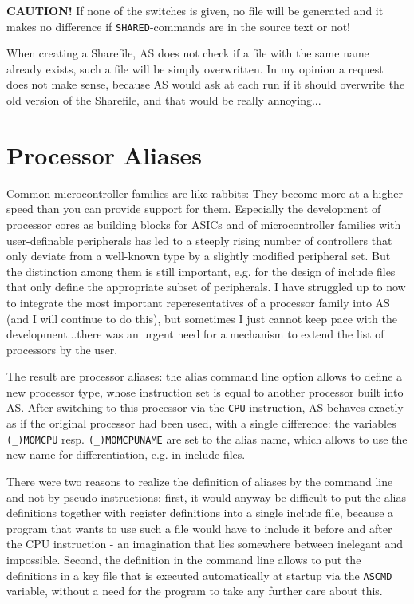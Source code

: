 \documentclass[12pt,twoside]{report}
\newcommand{\bb}[1]{{\bf #1}}
\newcommand{\tty}[1]{{\tt #1}}
\newcommand{\asname}{{AS}}
\newcommand{\predefsym}[1]{{\tt (\_)#1}}
\begin{document}
\bb{CAUTION!} If none of the switches is given, no file will be
generated and it makes no difference if \tty{SHARED}-commands are in the
source text or not!

When creating a Sharefile, \asname{} does not check if a file with the
same name already exists, such a file  will be simply overwritten.
In my opinion a request does not make sense, because \asname{} would
ask at each run if it should overwrite the old version of the
Sharefile, and that would be really annoying...


\section{Processor Aliases}
\label{SectAlias}

Common microcontroller families are like rabbits: They become more at
a higher speed than you can provide support for them.  Especially the
development of processor cores as building blocks for ASICs and of
microcontroller families with user-definable peripherals has led to a
steeply rising number of controllers that only deviate from a
well-known type by a slightly modified peripheral set.  But the
distinction among them is still important, e.g. for the design of
include files that only define the appropriate subset of peripherals.
I have struggled up to now to integrate the most important
reperesentatives of a processor family into \asname{} (and I will continue
to do this), but sometimes I just cannot keep pace with the
development...there was an urgent need for a mechanism to extend the
list of processors by the user.

The result are processor aliases: the alias command line option allows to
define a new processor type, whose instruction set is equal to another
processor built into \asname{}.  After switching to this processor via the
\tty{CPU} instruction, \asname{} behaves exactly as if the original processor had
been used, with a single difference: the variables \predefsym{MOMCPU} resp.
\predefsym{MOMCPUNAME} are set to the alias name, which allows to use the new
name for differentiation, e.g. in include files.

There were two reasons to realize the definition of aliases by the
command line and not by pseudo instructions: first, it would anyway be
difficult to put the alias definitions together with register definitions
into a single include file, because a program that wants to use such a
file would have to include it before and after the CPU instruction - an
imagination that lies somewhere between inelegant and impossible.  Second,
the definition in the command line allows to put the definitions in a key
file that is executed automatically at startup via the \tty{ASCMD}
variable, without a need for the program to take any further care about
this.
\end{document}
